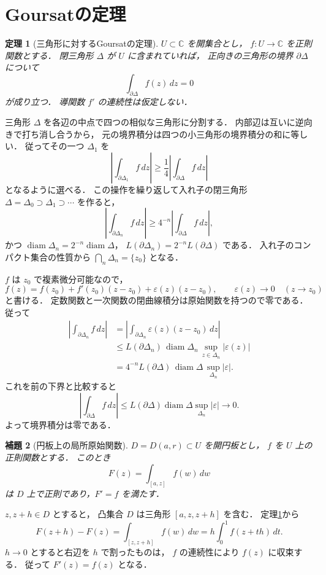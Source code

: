 \documentclass[a5paper,10pt,onecolumn]{jsarticle}
\makeatletter
\theoremstyle{mathnotetheorem}
\newtheorem{theorem}{定理}[section]
\newtheorem{lemma}[theorem]{補題}
\renewcommand{\proofname}{証明}
\renewenvironment{proof}[1][\proofname]{%
  \par\pushQED{\qed}\normalfont\topsep4\p@\@plus2\p@\relax
  \trivlist\item[\hskip\labelsep\bfseries #1]\ignorespaces
}{\popQED\endtrivlist\@endpefalse}
\makeatother
\begin{document}
\section{Goursatの定理}

\begin{theorem}[三角形に対するGoursatの定理]\label{thm:goursat}
$U\subset\mathbb C$ を開集合とし，
$f:U\to\mathbb C$ を正則関数とする．
閉三角形 $\Delta$ が $U$ に含まれていれば，
正向きの三角形の境界 $\partial\Delta$ について
\[
 \int_{\partial\Delta}f(z)\,dz=0
\]
が成り立つ．
導関数 $f'$ の連続性は仮定しない．
\end{theorem}
\begin{proof}
三角形 $\Delta$ を各辺の中点で四つの相似な三角形に分割する．
内部辺は互いに逆向きで打ち消し合うから，
元の境界積分は四つの小三角形の境界積分の和に等しい．
従ってその一つ $\Delta_1$ を
\[
 \left|\int_{\partial\Delta_1}f\,dz\right|
 \ge\frac14\left|\int_{\partial\Delta}f\,dz\right|
\]
となるように選べる．
この操作を繰り返して入れ子の閉三角形
$\Delta=\Delta_0\supset\Delta_1\supset\cdots$ を作ると，
\[
 \left|\int_{\partial\Delta_n}f\,dz\right|
 \ge4^{-n}\left|\int_{\partial\Delta}f\,dz\right|,
\]
かつ
$\operatorname{diam}\Delta_n=2^{-n}\operatorname{diam}\Delta$，
$L(\partial\Delta_n)=2^{-n}L(\partial\Delta)$ である．
入れ子のコンパクト集合の性質から
$\bigcap_n\Delta_n=\{z_0\}$ となる．

$f$ は $z_0$ で複素微分可能なので，
\[
 f(z)=f(z_0)+f'(z_0)(z-z_0)+\varepsilon(z)(z-z_0),
 \qquad \varepsilon(z)\to0\quad(z\to z_0)
\]
と書ける．
定数関数と一次関数の閉曲線積分は原始関数を持つので零である．
従って
\begin{align*}
 \left|\int_{\partial\Delta_n}f\,dz\right|
 &=\left|\int_{\partial\Delta_n}
       \varepsilon(z)(z-z_0)\,dz\right|\\
 &\le L(\partial\Delta_n)\,
       \operatorname{diam}\Delta_n\,
       \sup_{z\in\Delta_n}|\varepsilon(z)|\\
 &=4^{-n}L(\partial\Delta)\,
       \operatorname{diam}\Delta\,
       \sup_{\Delta_n}|\varepsilon|.
\end{align*}
これを前の下界と比較すると
\[
 \left|\int_{\partial\Delta}f\,dz\right|
 \le L(\partial\Delta)\operatorname{diam}\Delta
      \sup_{\Delta_n}|\varepsilon|\to0.
\]
よって境界積分は零である．
\end{proof}

\begin{lemma}[円板上の局所原始関数]\label{lem:local-primitive}
$D=D(a,r)\subset U$ を開円板とし，
$f$ を $U$ 上の正則関数とする．
このとき
\[
 F(z)=\int_{[a,z]}f(w)\,dw
\]
は $D$ 上で正則であり，$F'=f$ を満たす．
\end{lemma}
\begin{proof}
$z,z+h\in D$ とすると，
凸集合 $D$ は三角形 $[a,z,z+h]$ を含む．
定理\ref{thm:goursat}から
\[
 F(z+h)-F(z)=\int_{[z,z+h]}f(w)\,dw
 =h\int_0^1f(z+th)\,dt.
\]
$h\to0$ とすると右辺を $h$ で割ったものは，
$f$ の連続性により $f(z)$ に収束する．
従って $F'(z)=f(z)$ となる．
\end{proof}
\end{document}
